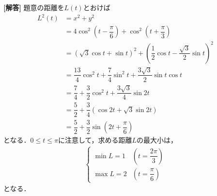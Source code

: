 \documentclass[../../main.tex]{subfiles}
\begin{document}
\begin{oframed}
  
\end{oframed}

{\bf [解答]} 題意の距離を$L(t)$とおけば
\begin{align}
  L^2(t)&=x^2+y^2 \\
  &=4\cos^2\left(t-\dfrac{\pi}{6}\right)+\cos^2\left(t+\dfrac{\pi}{3}\right)  \\
  &=\left(\sqrt{3}\cos t+\sin t\right)^2+\left(\dfrac{1}{2}\cos t-\dfrac{\sqrt{3}}{2}\sin t\right)^2 \\
  &=\dfrac{13}{4}\cos^2 t +\dfrac{7}{4}\sin^2 t+\dfrac{3\sqrt{3}}{2}\sin t\cos t  \\
  &=\dfrac{7}{4}+\dfrac{3}{2}\cos^2t+\dfrac{3\sqrt{3}}{4}\sin2t \\
  &=\dfrac{5}{2}+\dfrac{3}{4}(\cos2t+\sqrt{3}\sin2t) \\
  &=\dfrac{5}{2}+\dfrac{3}{2}\sin\left(2t+\dfrac{\pi}{6}\right)
\end{align}
となる．$0\le t\le \pi$に注意して，求める距離$L$の最大小は，
\begin{align}
  \left\{
    \begin{array}{ll}
      \min L=1 &\left(t=\dfrac{2\pi}{3}\right)     \\
      \max L=2 &\left(t=\dfrac{\pi}{6}\right)
    \end{array}
    \right.\tag{答}
  \end{align}
  となる．
  \newpage
  
\end{document}

